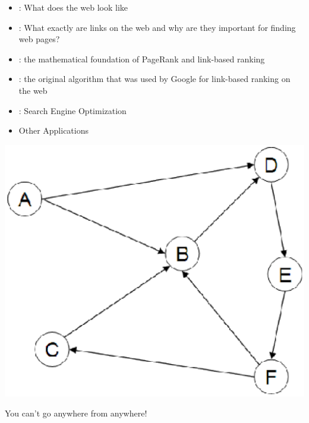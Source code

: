 \documentclass[a4paper,landscape,headrule,footrule,xetex]{foils}
\begin{document}

\begin{itemize}
\item {}: What does the web look like

\item {}: What exactly are links on the web and why are
  they important for finding web pages?

\item {}: the mathematical foundation of
  PageRank and link-based ranking

\item {}: the original algorithm that was used by Google for
  link-based ranking on the web

\item {}: Search Engine Optimization

\item Other Applications

\end{itemize}


\begin{center}
\includegraphics[height=0.8\textheight]{../pics/graph.eps}  
\end{center}

You can't go anywhere from anywhere!
\end{document}
